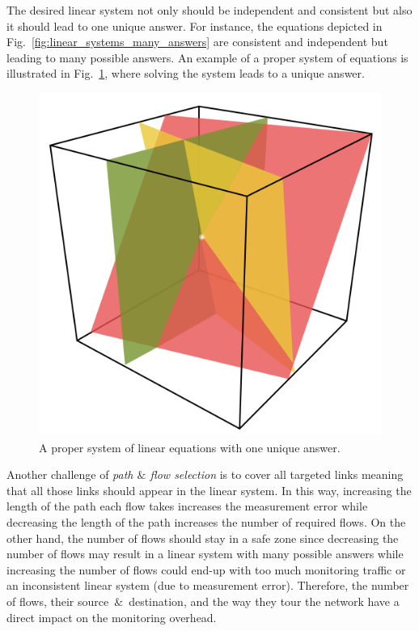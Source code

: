 \documentclass[10pt, journal, letterpaper]{IEEEtran}
\begin{document}
The desired linear system not only should be independent and consistent but also it should lead to one unique answer. For instance, the equations depicted in Fig.~\ref{fig:linear_systems_many_answers} are consistent and independent but leading to many possible answers. An example of a proper system of equations is illustrated in Fig.~\ref{fig:linear_system_perfect}, where solving the system leads to a unique answer.
\begin{figure}
    \centering
    \includegraphics[width=0.49\columnwidth]{img/perfectsolution.png}
    \caption{A proper system of linear equations with one unique answer.}
    \label{fig:linear_system_perfect}
\end{figure}
Another challenge of \textit{path $\&$ flow selection} is to cover all targeted links meaning that all those links should appear in the linear system. In this way, increasing the length of the path each flow takes increases the measurement error while decreasing the length of the path increases the number of required flows. On the other hand, the number of flows should stay in a safe zone since decreasing the number of flows may result in a linear system with many possible answers while increasing the number of flows could end-up with too much monitoring traffic or an inconsistent linear system (due to measurement error). Therefore, the number of flows, their source~$\&$~destination, and the way they tour the network have a direct impact on the monitoring overhead.
\end{document}
